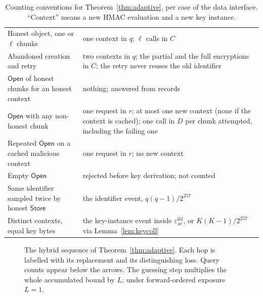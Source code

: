 \documentclass[pdflatex,sn-mathphys-num]{sn-jnl}
\theoremstyle{plain}
\theoremstyle{definition}
\begin{document}
\begin{table}[htbp]
\caption{Counting conventions for Theorem~\ref{thm:adaptive}, per case of the data interface. ``Context'' means a new HMAC evaluation and a new key instance.}\label{tab:counts}
\centering\footnotesize
\altrows
\begin{tabularx}{\linewidth}{@{}p{.36\linewidth}Y@{}}\toprule
{} & \\\midrule
Honest object, one or $\ell$ chunks & one context in $q$; $\ell$ calls in $C$\\
Abandoned creation and retry & two contexts in $q$; the partial and the full encryptions in $C$; the retry never reuses the old identifier\\
$\mathsf{Open}$ of honest chunks for an honest context & nothing; answered from records\\
$\mathsf{Open}$ with any non-honest chunk & one request in $r$; at most one new context (none if the context is cached); one call in $D$ per chunk attempted, including the failing one\\
Repeated $\mathsf{Open}$ on a cached malicious context & one request in $r$; no new context\\
Empty $\mathsf{Open}$ & rejected before key derivation; not counted\\
Same identifier sampled twice by honest $\mathsf{Store}$ & the identifier event, $q(q-1)/2^{257}$\\
Distinct contexts, equal key bytes & the key-instance event inside $\varepsilon^{\mathrm{iid}}_{\mathrm{ae}}$, or $K(K-1)/2^{257}$ via Lemma~\ref{lem:keycoll}\\\bottomrule
\end{tabularx}
\end{table}

\begin{figure}[t]
\centering
\resizebox{\linewidth}{!}{}
\caption{The hybrid sequence of Theorem~\ref{thm:adaptive}. Each hop is labelled with its replacement and its distinguishing loss. Query counts appear below the arrows. The guessing step multiplies the whole accumulated bound by $L$; under forward-ordered exposure $L=1$.}\label{fig:hybrids}
\end{figure}
\end{document}
